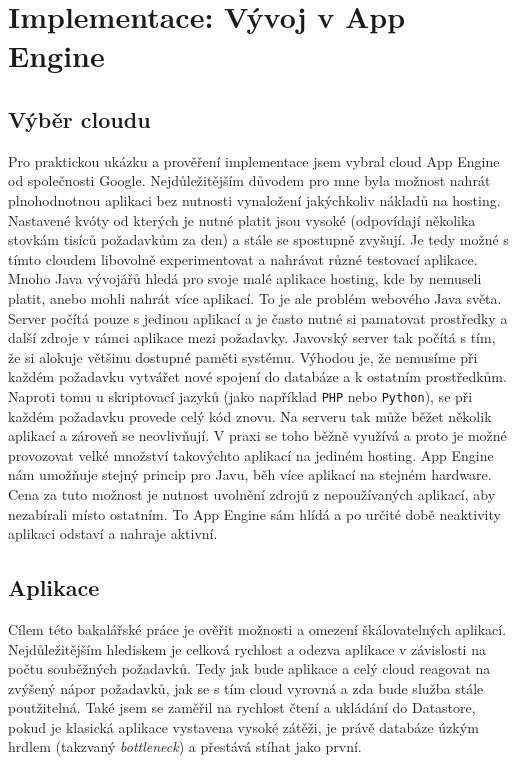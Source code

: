 \chapter{Implementace: Vývoj v App Engine}

\section{Výběr cloudu}
Pro praktickou ukázku a prověření implementace jsem vybral cloud App Engine od společnosti Google. Nejdůležitějším důvodem pro mne byla možnost nahrát plnohodnotnou aplikaci bez nutnosti vynaložení jakýchkoliv nákladů na hosting. Nastavené kvóty od kterých je nutné platit jsou vysoké (odpovídají několika stovkám tisíců požadavkům za den) a stále se spostupně zvyšují. Je tedy možné s tímto cloudem libovolně experimentovat a nahrávat různé testovací aplikace. Mnoho Java vývojářů hledá pro svoje malé aplikace hosting, kde by nemuseli platit, anebo mohli nahrát více aplikací. To je ale problém webového Java světa. Server počítá pouze s jedinou aplikací a je často nutné si pamatovat prostředky a další zdroje v rámci aplikace mezi požadavky. Javovský server tak počítá s tím, že si alokuje většinu dostupné paměti systému. Výhodou je, že nemusíme při každém požadavku vytvářet nové spojení do databáze a k ostatním prostředkům. Naproti tomu u skriptovací jazyků (jako například \verb|PHP| nebo \verb|Python|), se při každém požadavku provede celý kód znovu. Na serveru tak může běžet několik aplikací a zároveň se neovlivňují. V praxi se toho běžně využívá a proto je možné provozovat velké množství takovýchto aplikací na jediném hosting. App Engine nám umožňuje stejný princip pro Javu, běh více aplikací na stejném hardware. Cena za tuto možnost je nutnost uvolnění zdrojů z nepoužívaných aplikací, aby nezabírali místo ostatním. To App Engine sám hlídá a po určité době neaktivity aplikaci odstaví a nahraje aktivní.

\section{Aplikace}
Cílem této bakalářské práce je ověřit možnosti a omezení škálovatelných aplikací. Nejdůležitějším hlediskem je celková rychlost a odezva aplikace v závislosti na počtu souběžných požadavků. Tedy jak bude aplikace a celý cloud reagovat na zvýšený nápor požadavků, jak se s tím cloud vyrovná a zda bude služba stále poutžitelná. Také jsem se zaměřil na rychlost čtení a ukládání do Datastore, pokud je klasická aplikace vystavena vysoké zátěži, je právě databáze úzkým hrdlem (takzvaný \emph{bottleneck}) a přestává stíhat jako první. 

